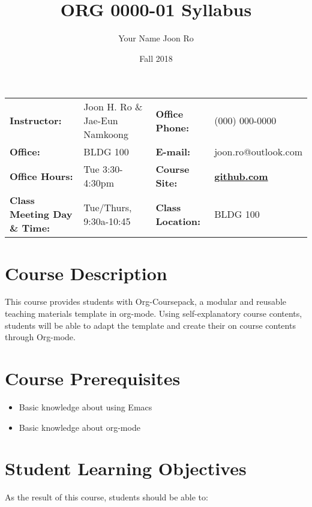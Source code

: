 \documentclass[article,letterpaper,times,10pt,listings-bw,microtype]{scrartcl}
\author{Your Name Joon Ro}
\date{Fall 2018}
\title{ORG 0000-01 Syllabus}
\begin{document}

\begin{center}
{}
\end{center}

\begin{center}
{}
\end{center}

\vspace{5 mm}

\begin{center}
\begin{tabular}{llll}
\textbf{Instructor:} & Joon H. Ro \& Jae-Eun Namkoong & \textbf{Office Phone:} & (000) 000-0000\\
\textbf{Office:} & BLDG 100 & \textbf{E-mail:} & joon.ro@outlook.com\\
\textbf{Office Hours:} & Tue 3:30-4:30pm & \textbf{Course Site:} & \textbf{\href{https://github.com}{github.com}}\\
\textbf{Class Meeting Day \& Time:} & Tue/Thurs, 9:30a-10:45 & \textbf{Class Location:} & BLDG 100\\
\end{tabular}
\end{center}
\section*{Course Description}
\label{sec:orgbac35d1}
This course provides students with Org-Coursepack, a modular and reusable
teaching materials template in org-mode. Using self-explanatory course
contents, students will be able to adapt the template and create their on
course contents through Org-mode.
\section*{Course Prerequisites}
\label{sec:org8803189}
\begin{itemize}
\item Basic knowledge about using Emacs
\item Basic knowledge about org-mode
\end{itemize}
\section*{Student Learning Objectives}
\label{sec:orgb052fde}
As the result of this course, students should be able to:
\end{document}
